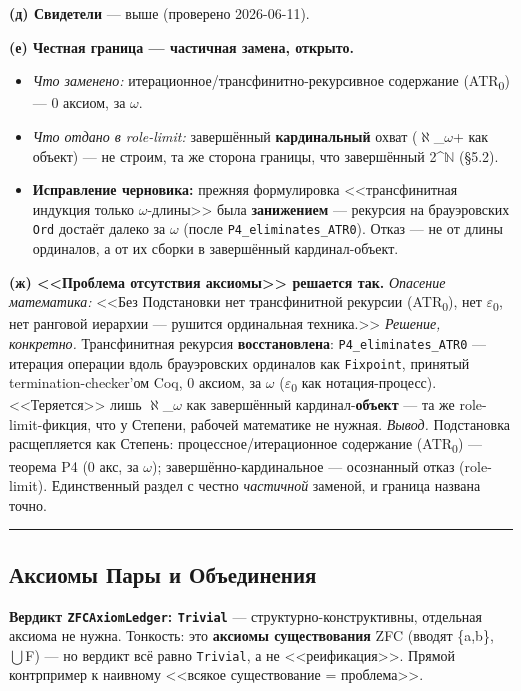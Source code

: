 \documentclass[11pt,a4paper]{article}
\begin{document}
\textbf{(д) Свидетели} --- выше (проверено 2026-06-11).

\textbf{(е) Честная граница --- частичная замена, открыто.}
\begin{itemize}
\item \emph{Что заменено:} итерационное/трансфинитно-рекурсивное содержание (ATR\textsubscript{0}) --- 0 аксиом, за $\omega$.
\item \emph{Что отдано в role-limit:} завершённый \textbf{кардинальный} охват ($\aleph$\_$\omega$+ как объект) --- не строим, та же сторона границы, что завершённый 2\textasciicircum{}$\mathbb{N}$ (\S{}5.2).
\item \textbf{Исправление черновика:} прежняя формулировка <<трансфинитная индукция только $\omega$-длины>> была \textbf{занижением} --- рекурсия на брауэровских \texttt{Ord} достаёт далеко за $\omega$ (после \texttt{P4\_\allowbreak{}eliminates\_\allowbreak{}ATR0}). Отказ --- не от длины ординалов, а от их сборки в завершённый кардинал-объект.
\end{itemize}

\textbf{(ж) <<Проблема отсутствия аксиомы>> решается так.} \emph{Опасение математика:} <<Без Подстановки нет трансфинитной рекурсии (ATR\textsubscript{0}), нет $\varepsilon$\textsubscript{0}, нет ранговой иерархии --- рушится ординальная техника.>> \emph{Решение, конкретно.} Трансфинитная рекурсия \textbf{восстановлена}: \texttt{P4\_\allowbreak{}eliminates\_\allowbreak{}ATR0} --- итерация операции вдоль брауэровских ординалов как \texttt{Fixpoint}, принятый termination-checker'ом Coq, 0 аксиом, за $\omega$ ($\varepsilon$\textsubscript{0} как нотация-процесс). <<Теряется>> лишь $\aleph$\_$\omega$ как завершённый кардинал-\textbf{объект} --- та же role-limit-фикция, что у Степени, рабочей математике не нужная. \emph{Вывод.} Подстановка расщепляется как Степень: процессное/итерационное содержание (ATR\textsubscript{0}) --- теорема P4 (0 акс, за $\omega$); завершённо-кардинальное --- осознанный отказ (role-limit). Единственный раздел с честно \emph{частичной} заменой, и граница названа точно.

\bigskip\hrule\bigskip

\subsection{Аксиомы Пары и Объединения}

\textbf{Вердикт \texttt{ZFCAxiom\allowbreak{}Ledger}: \texttt{Trivial}} --- структурно-конструктивны, отдельная аксиома не нужна. Тонкость: это \textbf{аксиомы существования} ZFC (вводят \{a,b\}, $\bigcup$F) --- но вердикт всё равно \texttt{Trivial}, а не <<реификация>>. Прямой контрпример к наивному <<всякое существование = проблема>>.
\end{document}
